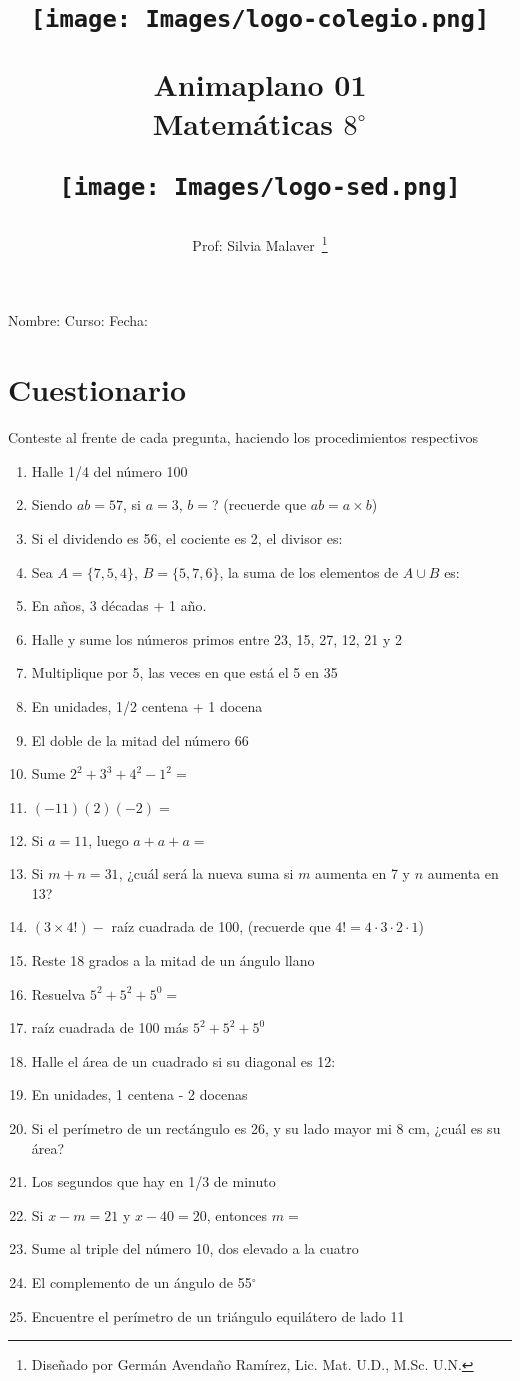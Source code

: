 \documentclass[twoside]{article}
\author{Prof: Silvia Malaver~\thanks{Diseñado por Germán Avendaño Ramírez, Lic. Mat. U.D., M.Sc. U.N.}}
\title{\begin{minipage}{.2\textwidth}
\texttt{[image: Images/logo-colegio.png]}\end{minipage}
\begin{minipage}{.55\textwidth}
\begin{center}
Animaplano 01\\
Matemáticas $8^{\circ}$
\end{center}
\end{minipage}\hfill
\begin{minipage}{.2\textwidth}
\texttt{[image: Images/logo-sed.png]} 
\end{minipage}}
\date{}
\begin{document}
\maketitle
Nombre: \hrulefill Curso: \underline{\hspace*{44pt}} Fecha: \underline{\hspace*{2.5cm}}
\section*{Cuestionario}
Conteste al frente de cada pregunta, haciendo los procedimientos respectivos
\begin{enumerate}
 \item Halle 1/4 del número 100
 \item Siendo $ab=57$, si $a=3$, $b=$? (recuerde que $ab=a\times b$)
 \item Si el dividendo es 56, el cociente es 2, el divisor es:
 \item Sea $A=\{7,5,4\}$, $B=\{5,7,6\}$, la suma de los elementos de $A\cup B$ es:
 \item En años, 3 décadas + 1 año.
 \item Halle y sume los números primos entre 23, 15, 27, 12, 21 y 2
 \item Multiplique por 5, las veces en que está el 5 en 35
 \item En unidades, 1/2 centena + 1 docena
 \item El doble de la mitad del número 66
 \item Sume $2^{2}+3^{3}+4^{2}-1^{2}=$
 \item $(-11)(2)(-2)=$
 \item Si $a=11$, luego $a+a+a=$
 \item Si $m+n=31$, ¿cuál será la nueva suma si $m$ aumenta en 7 y $n$ aumenta en 13?
 \item $(3\times4!)-$ raíz cuadrada de 100, \quad (recuerde que $4!=4\cdot 3\cdot2 \cdot1$)
 \item Reste 18 grados a la mitad de un ángulo llano
 \item Resuelva $5^{2}+5^{2}+5^{0}=$
 \item raíz cuadrada de 100 más $5^{2}+5^{2}+5^{0}$
 \item Halle el área de un cuadrado si su diagonal es 12:
 \item En unidades, 1 centena - 2 docenas
 \item Si el perímetro de un rectángulo es 26, y su lado mayor mi 8 cm, ¿cuál es su área?
 \item Los segundos que hay en 1/3 de minuto
 \item Si $x-m=21$ y $x-40=20$, entonces $m=$
 \item Sume al triple del número 10, dos elevado a la cuatro
 \item El complemento de un ángulo de 55$^{\circ}$
 \item Encuentre el perímetro de un triángulo equilátero de lado 11
\end{enumerate}
\end{document}
